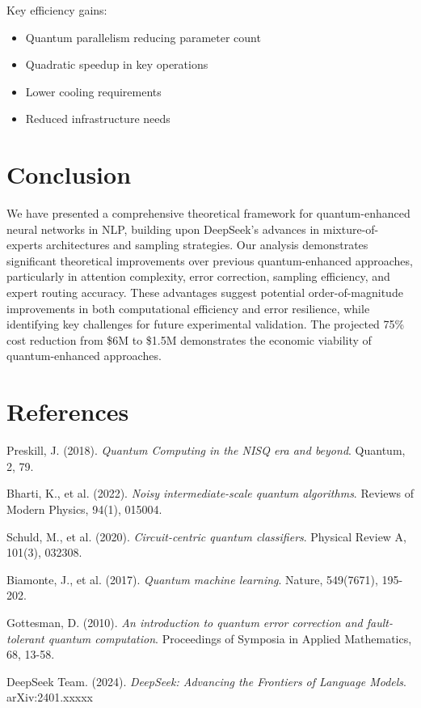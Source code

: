 \documentclass{article}
\begin{document}
Key efficiency gains:
\begin{itemize}
\item Quantum parallelism reducing parameter count
\item Quadratic speedup in key operations
\item Lower cooling requirements
\item Reduced infrastructure needs
\end{itemize}

\section{Conclusion}
We have presented a comprehensive theoretical framework for quantum-enhanced neural networks in NLP, building upon DeepSeek's advances in mixture-of-experts architectures and sampling strategies. Our analysis demonstrates significant theoretical improvements over previous quantum-enhanced approaches, particularly in attention complexity, error correction, sampling efficiency, and expert routing accuracy. These advantages suggest potential order-of-magnitude improvements in both computational efficiency and error resilience, while identifying key challenges for future experimental validation. The projected 75\% cost reduction from \$6M to \$1.5M demonstrates the economic viability of quantum-enhanced approaches.

\section{References}
\begin{thebibliography}{9}

Preskill, J. (2018).
\textit{Quantum Computing in the NISQ era and beyond}.
Quantum, 2, 79.

Bharti, K., et al. (2022).
\textit{Noisy intermediate-scale quantum algorithms}.
Reviews of Modern Physics, 94(1), 015004.

Schuld, M., et al. (2020).
\textit{Circuit-centric quantum classifiers}.
Physical Review A, 101(3), 032308.

Biamonte, J., et al. (2017).
\textit{Quantum machine learning}.
Nature, 549(7671), 195-202.

Gottesman, D. (2010).
\textit{An introduction to quantum error correction and fault-tolerant quantum computation}.
Proceedings of Symposia in Applied Mathematics, 68, 13-58.

DeepSeek Team. (2024).
\textit{DeepSeek: Advancing the Frontiers of Language Models}.
arXiv:2401.xxxxx

\end{thebibliography}
\end{document}
